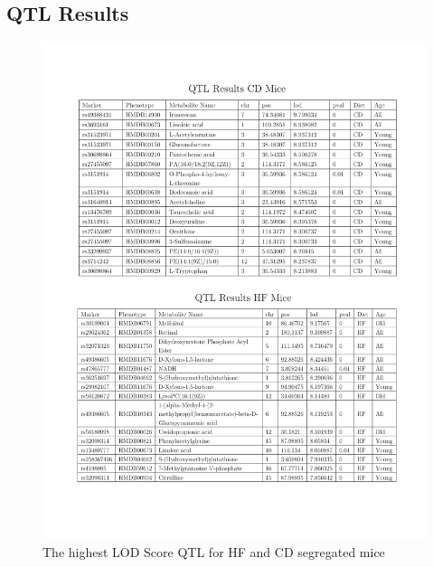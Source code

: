 \documentclass[a4paper,11pt,twoside]{book}
\begin{document}
\begin{subappendices}
\section{QTL Results}
\begin{figure}[tbh!]
	\centering
	\includegraphics[width=.9\linewidth]{3.Metabolomics/Metabolite_QTL_Tables}
	\caption{The highest LOD Score QTL for HF and CD segregated mice}
	\label{fig:Metabolite QTL Results Tables}
\end{figure}
\clearpage



\end{subappendices}
\end{document}
